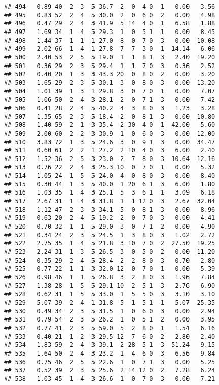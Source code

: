 \documentclass[
]{article}
\begin{document}
\begin{verbatim}
## 494   0.89 40  2  3  5 36.7  2  0  4 0  1   0.00   3.56
## 495   0.83 52  2  4  5 30.0  2  0  6 0  2   0.00   4.98
## 496   0.47 29  2  4  3 41.9  5 14  4 0  1   6.58   1.88
## 497   1.69 34  1  4  5 29.3  1  0  5 1  1   0.00   8.45
## 498   1.44 37  1  1  1 27.0  8  0  7 0  3   0.00  10.08
## 499   2.02 66  1  4  1 27.8  7  7  3 0  1  14.14   6.06
## 500   2.40 53  2  5  5 19.0  1  1  8 1  3   2.40  19.20
## 501   0.36 29  2  3  5 29.4  1  1  7 0  3   0.36   2.52
## 502   0.40 20  1  3  3 43.3 20  0  8 0  2   0.00   3.20
## 503   1.65 29  2  3  5 30.1  3  0  8 0  3   0.00  13.20
## 504   1.01 39  1  3  1 29.8  3  0  7 0  1   0.00   7.07
## 505   1.06 50  2  4  3 28.1  2  0  7 1  3   0.00   7.42
## 506   0.41 28  2  4  5 40.2  4  3  8 0  3   1.23   3.28
## 507   1.35 65  2  3  5 18.4  2  0  8 1  3   0.00  10.80
## 508   1.40 59  2  1  3 35.4  2 30  4 0  1  42.00   5.60
## 509   2.00 60  2  2  3 30.9  1  0  6 0  3   0.00  12.00
## 510   3.83 72  1  3  5 24.6  3  0  9 1  3   0.00  34.47
## 511   0.60 61  2  2  1 27.2  2 10  4 0  3   6.00   2.40
## 512   1.52 36  2  5  3 23.0  2  7  8 0  3  10.64  12.16
## 513   0.76 22  2  4  3 25.3 10  0  7 0  1   0.00   5.32
## 514   1.05 24  1  5  5 24.0  4  0  8 0  3   0.00   8.40
## 515   0.30 44  1  3  5 40.0  1 20  6 1  3   6.00   1.80
## 516   1.03 35  1  4  3 25.1  5  3  6 1  1   3.09   6.18
## 517   2.67 31  1  4  3 31.8  1  1 12 0  3   2.67  32.04
## 518   1.12 47  2  3  3 34.1  5  0  8 1  3   0.00   8.96
## 519   0.63 20  2  4  5 19.2  2  0  7 0  3   0.00   4.41
## 520   0.70 32  1  1  5 29.0  3  0  7 1  2   0.00   4.90
## 521   0.34 24  2  3  5 24.5  1  3  8 0  3   1.02   2.72
## 522   2.75 35  1  4  5 21.8  3 10  7 0  2  27.50  19.25
## 523   2.24 31  1  3  5 26.5  3  0  5 0  2   0.00  11.20
## 524   0.35 29  2  4  5 28.4  2  2  8 0  3   0.70   2.80
## 525   0.77 22  1  1  3 32.0 12  0  7 0  1   0.00   5.39
## 526   0.98 46  1  1  5 26.8  3  2  8 0  3   1.96   7.84
## 527   1.38 28  1  5  5 29.1 10  2  5 1  3   2.76   6.90
## 528   0.62 31  1  5  5 33.0  1  5  5 0  3   3.10   3.10
## 529   5.07 39  2  4  1 31.8  5  1  5 1  1   5.07  25.35
## 530   0.49 34  2  3  5 31.5  1  0  6 0  3   0.00   2.94
## 531   0.79 54  2  3  5 26.2  1  0  5 1  2   0.00   3.95
## 532   0.77 41  2  3  5 59.0  5  2  8 0  1   1.54   6.16
## 533   0.40 21  1  2  3 29.5 12  7  6 0  2   2.80   2.40
## 534   1.83 59  2  4  3 39.1  2 28  5 1  3  51.24   9.15
## 535   1.64 50  2  4  3 23.2  1  4  6 0  3   6.56   9.84
## 536   0.75 46  2  5  5 22.6  1  0  7 1  3   0.00   5.25
## 537   0.52 39  2  3  5 25.6  2 14 12 0  2   7.28   6.24
## 538   1.03 45  1  4  3 26.6  1  0  7 0  3   0.00   7.21

\end{verbatim}
\end{document}
